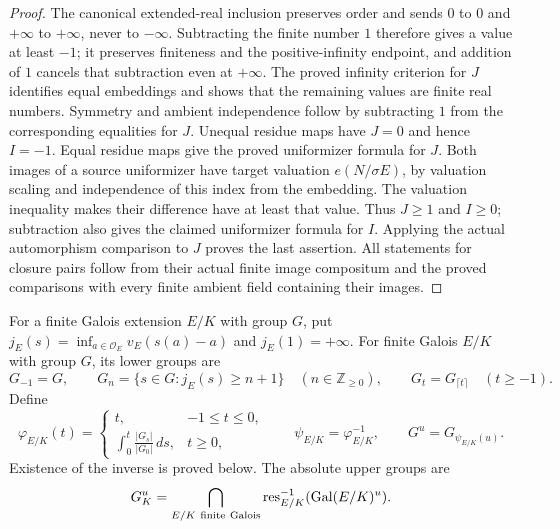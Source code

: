 \begin{proof}
The canonical extended-real inclusion preserves order and sends
$0$ to $0$ and $+\infty$ to $+\infty$, never to $-\infty$.
Subtracting the finite number $1$ therefore gives a value at
least $-1$; it preserves finiteness and the positive-infinity
endpoint, and addition of $1$ cancels that subtraction even at
$+\infty$. The proved infinity criterion for $J$ identifies
equal embeddings and shows that the remaining values are finite
real numbers. Symmetry and ambient independence follow by
subtracting $1$ from the corresponding equalities for $J$.
Unequal residue maps have $J=0$ and hence $I=-1$. Equal residue
maps give the proved uniformizer formula for $J$. Both images of
a source uniformizer have target valuation $e(N/\sigma E)$,
by valuation scaling and independence of this index from the
embedding. The valuation inequality makes their difference have
at least that value. Thus $J\geq1$ and $I\geq0$; subtraction
also gives the claimed uniformizer formula for $I$. Applying the actual
automorphism comparison to $J$ proves the last assertion. All
statements for closure pairs follow from their actual finite
image compositum and the proved comparisons with every finite
ambient field containing their images.
\end{proof}

\begin{definition}
\label{fw:ramification-filtration}
\leanok
For a finite Galois extension $E/K$ with group $G$, put
$j_E(s)=\inf_{a\in\mathcal O_E}v_E(s(a)-a)$ and $j_E(1)=+\infty$.
For finite Galois $E/K$ with group $G$, its lower groups are
\[
 G_{-1}=G,\qquad
 G_n=\{s\in G:j_E(s)\geq n+1\}\quad(n\in\mathbb Z_{\geq0}),
 \qquad G_t=G_{\lceil t\rceil}\quad(t\geq-1).
\]
Define
\[
 \varphi_{E/K}(t)=
 \begin{cases}
 t,&-1\leq t\leq0,\\
 \displaystyle\int_0^t\frac{|G_s|}{|G_0|}\,ds,&t\geq0,
 \end{cases}
 \qquad \psi_{E/K}=\varphi_{E/K}^{-1},\qquad
 G^u=G_{\psi_{E/K}(u)}.
\]
Existence of the inverse is proved below. The absolute upper groups are
\[
 G_K^u=\bigcap_{E/K\ \mathrm{finite\ Galois}}
    \operatorname{res}_{E/K}^{-1}(\operatorname{Gal}(E/K)^u).
\]
\end{definition}

